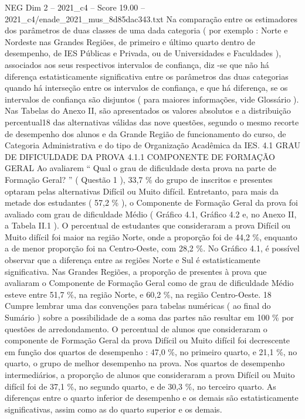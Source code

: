 \begin{textsample}{NEG Dim 2 – 2021\_c4 – Score 19.00 – 2021\_c4/enade\_2021\_mus\_8d85dac343.txt}
Na comparação entre os estimadores dos parâmetros de duas classes de uma dada categoria ( por exemplo : Norte e Nordeste nas Grandes Regiões, de primeiro e último quarto dentro de desempenho, de IES Públicas e Privada, ou de Universidades e Faculdades ), associados aos seus respectivos intervalos de confiança, diz -se que não há diferença estatisticamente significativa entre os parâmetros das duas categorias quando há interseção entre os intervalos de confiança, e que há diferença, se os intervalos de confiança são disjuntos ( para maiores informações, vide Glossário ).
Nas Tabelas do Anexo II, são apresentados os valores absolutos e a distribuição percentual18 das alternativas válidas das nove questões, segundo o mesmo recorte de desempenho dos alunos e da Grande Região de funcionamento do curso, de Categoria Administrativa e do tipo de Organização Acadêmica da IES. 4.1 GRAU DE DIFICULDADE DA PROVA 4.1.1 COMPONENTE DE FORMAÇÃO GERAL Ao avaliarem “ Qual o grau de dificuldade desta prova na parte de Formação Geral? ” ( Questão 1 ), 33,7 \% do grupo de inscritos e presentes optaram pelas alternativas Difícil ou Muito difícil.
Entretanto, para mais da metade dos estudantes ( 57,2 \% ), o Componente de Formação Geral da prova foi avaliado com grau de dificuldade Médio ( Gráfico 4.1, Gráfico 4.2 e, no Anexo II, a Tabela II.1 ).
O percentual de estudantes que consideraram a prova Difícil ou Muito difícil foi maior na região Norte, onde a proporção foi de 44,2 \%, enquanto a de menor proporção foi na Centro-Oeste, com 28,2 \%.
No Gráfico 4.1, é possível observar que a diferença entre as regiões Norte e Sul é estatisticamente significativa.
Nas Grandes Regiões, a proporção de presentes à prova que avaliaram o Componente de Formação Geral como de grau de dificuldade Médio esteve entre 51,7 \%, na região Norte, e 60,2 \%, na região Centro-Oeste. 18 Cumpre lembrar uma das convenções para tabelas numéricas ( ao final do Sumário ) sobre a possibilidade de a soma das partes não resultar em 100 \% por questões de arredondamento.
O percentual de alunos que consideraram o componente de Formação Geral da prova Difícil ou Muito difícil foi decrescente em função dos quartos de desempenho : 47,0 \%, no primeiro quarto, e 21,1 \%, no quarto, o grupo de melhor desempenho na prova.
Nos quartos de desempenho intermediários, a proporção de alunos que consideraram a prova Difícil ou Muito difícil foi de 37,1 \%, no segundo quarto, e de 30,3 \%, no terceiro quarto.
As diferenças entre o quarto inferior de desempenho e os demais são estatisticamente significativas, assim como as do quarto superior e os demais.

\end{textsample}
